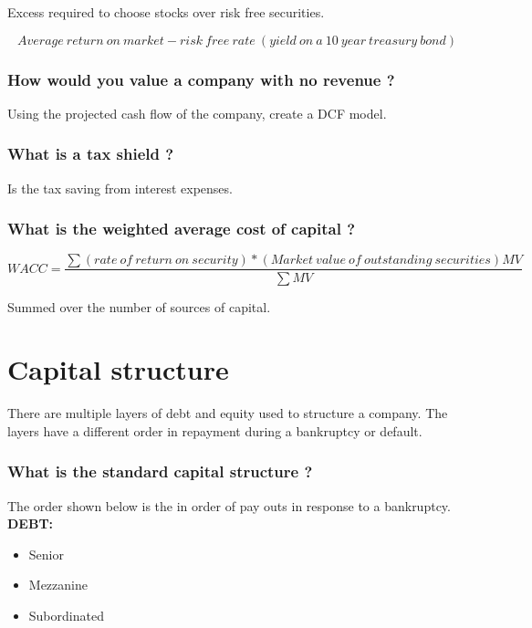 \documentclass[11pt]{scrartcl} %
\begin{document}
Excess required to choose stocks over risk free securities.

\[ Average\:return\:on\:market - risk\:free\:rate\:(yield\:on\:a\:10\:year\:treasury\:bond) \]

\subsubsection{How would you value a company with no revenue ?}

Using the projected cash flow of the company, create a DCF model. 

\subsubsection{What is a tax shield ?}

Is the tax saving from interest expenses.

\subsubsection{What is the weighted average cost of capital ?}

\[WACC = \frac{\sum (rate\:of\:return\:on\:security) * (Market\:value\:of\:outstanding\:securities)MV}{\sum{MV}}\]

Summed over the number of sources of capital.

\section{Capital structure}

There are multiple layers of debt and equity used to structure a company. The layers have a different order in repayment during a bankruptcy or default.

\subsubsection{What is the standard capital structure ?}

The order shown below is the in order of pay outs in response to a bankruptcy.\\

\textbf{DEBT:}

\begin{itemize}
	\item Senior
	\item Mezzanine
	\item Subordinated
\end{itemize}
\end{document}
